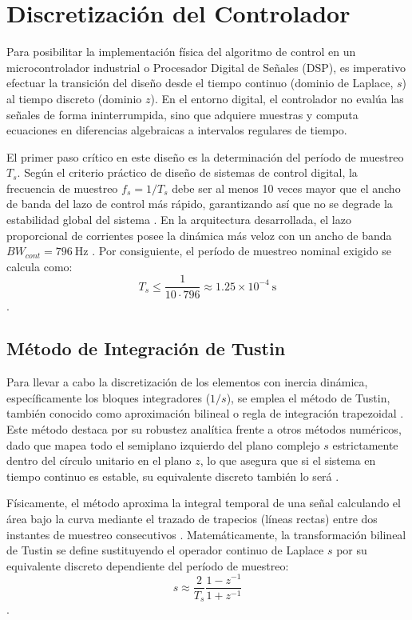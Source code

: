 \documentclass[12pt, a4paper,journal, onecolumn, compsoc]{IEEEtran}
\begin{document}
\section{Discretización del Controlador}

Para posibilitar la implementación física del algoritmo de control en un microcontrolador industrial o Procesador Digital de Señales (DSP), es imperativo efectuar la transición del diseño desde el tiempo continuo (dominio de Laplace, $s$) al tiempo discreto (dominio $z$). En el entorno digital, el controlador no evalúa las señales de forma ininterrumpida, sino que adquiere muestras y computa ecuaciones en diferencias algebraicas a intervalos regulares de tiempo.

El primer paso crítico en este diseño es la determinación del período de muestreo $T_s$. Según el criterio práctico de diseño de sistemas de control digital, la frecuencia de muestreo $f_s = 1/T_s$ debe ser al menos 10 veces mayor que el ancho de banda del lazo de control más rápido, garantizando así que no se degrade la estabilidad global del sistema . En la arquitectura desarrollada, el lazo proporcional de corrientes posee la dinámica más veloz con un ancho de banda $BW_{cont} = 796 \ \mathrm{Hz}$ . Por consiguiente, el período de muestreo nominal exigido se calcula como:
\begin{equation}
    T_s \leq \frac{1}{10 \cdot 796} \approx 1.25 \times 10^{-4} \ \mathrm{s}
\end{equation}.

\subsection{Método de Integración de Tustin}
Para llevar a cabo la discretización de los elementos con inercia dinámica, específicamente los bloques integradores ($1/s$), se emplea el método de Tustin, también conocido como aproximación bilineal o regla de integración trapezoidal . Este método destaca por su robustez analítica frente a otros métodos numéricos, dado que mapea todo el semiplano izquierdo del plano complejo $s$ estrictamente dentro del círculo unitario en el plano $z$, lo que asegura que si el sistema en tiempo continuo es estable, su equivalente discreto también lo será .

Físicamente, el método aproxima la integral temporal de una señal calculando el área bajo la curva mediante el trazado de trapecios (líneas rectas) entre dos instantes de muestreo consecutivos . Matemáticamente, la transformación bilineal de Tustin se define sustituyendo el operador continuo de Laplace $s$ por su equivalente discreto dependiente del período de muestreo:
\begin{equation}
    s \approx \frac{2}{T_s} \frac{1 - z^{-1}}{1 + z^{-1}}
\end{equation}.
\end{document}
